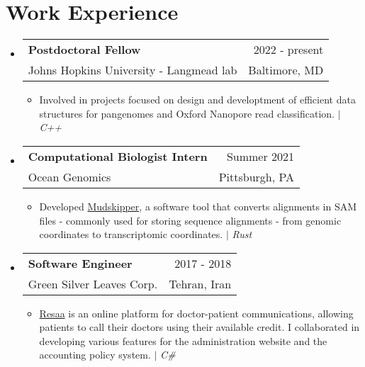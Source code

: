 \documentclass[A4,11pt]{article}
\makeatletter
\newcommand{\CVItem}[1]{
  \item\small{
    {#1 \vspace{-2pt}}
  }
}
\newcommand{\CVSubheading}[4]{
  \vspace{-2pt}\item
    \begin{tabular*}{0.97\textwidth}[t]{l@{\extracolsep{\fill}}r}
      \textbf{#1} & #2 \\
      \small#3 & \small #4 \\
    \end{tabular*}\vspace{-7pt}
}
\newcommand{\CVSubHeadingListStart}{\begin{itemize}[leftmargin=0.5cm, label={}]}
\newcommand{\CVSubHeadingListEnd}{\end{itemize}}
\newcommand{\CVItemListStart}{\begin{itemize}}
\newcommand{\CVItemListEnd}{\end{itemize}\vspace{-5pt}}
\makeatother
\begin{document}
\section{Work Experience}
  \CVSubHeadingListStart
    \CVSubheading{Postdoctoral Fellow}{2022 - present}
      {Johns Hopkins University - Langmead lab}{Baltimore, MD}
      \CVItemListStart
        \CVItem{Involved in projects focused on design and developtment of efficient data structures for pangenomes and Oxford Nanopore read classification. $|$ \emph{\small{C++}}}
      \CVItemListEnd
    \CVSubheading
      {Computational Biologist Intern}{Summer 2021} %
      {Ocean Genomics}{Pittsburgh, PA}
      \CVItemListStart
        \CVItem{Developed \href{https://github.com/OceanGenomics/mudskipper}{Mudskipper}, a software tool that converts alignments in SAM files - commonly used for storing
sequence alignments - from genomic coordinates to transcriptomic coordinates. $|$ \emph{\small{Rust}}}
      \CVItemListEnd
    \CVSubheading
      {Software Engineer}{2017 - 2018} %
      {Green Silver Leaves Corp.}{Tehran, Iran}
      \CVItemListStart
        \CVItem{\href{https://resaa.net/}{Resaa} is an online platform for doctor-patient communications, allowing patients to call
        their doctors using their available credit. I collaborated in developing various features for the administration website and the accounting
        policy system. $|$ \emph{\small{C\#}}}
      \CVItemListEnd
  \CVSubHeadingListEnd

\begin{comment}
Ideally the title of the work should speak for what it is. However if you feel
like you should explain more about why the project is applicable to this job,
use item list as is shown in the work experience section.
\end{comment}
\end{document}
